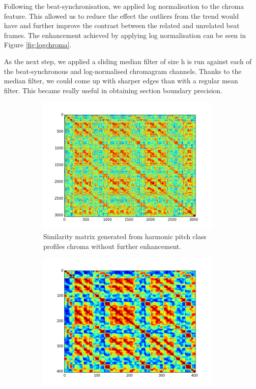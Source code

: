 Following the beat-synchronisation, we applied log normalisation to the chroma feature. This allowed us to reduce the effect the outliers from the trend would have and further improve the contrast between the related and unrelated beat frames. The enhancement achieved by applying log normalisation can be seen in Figure \ref{fig:logchroma}.

As the next step, we applied a sliding median filter of size h is run against each of the beat-synchronous and log-normalised chromagram channels. Thanks to the median filter, we could come up with sharper edges than with a regular mean filter. This became really useful in obtaining section boundary precision.

\begin{figure}
        \centering
        \begin{subfigure}[b]{0.47\textwidth}
                \includegraphics[width=\textwidth]{Figures/hpcp_unsynched_ssm}
                \caption{Similarity matrix generated from harmonic pitch class profiles chroma without further enhancement.}
                \label{fig:unSSM}
        \end{subfigure}%
        \begin{subfigure}[b]{0.47\textwidth}
                \includegraphics[width=\textwidth]{Figures/log_ssm_synched}

\end{subfigure}
\end{figure}
